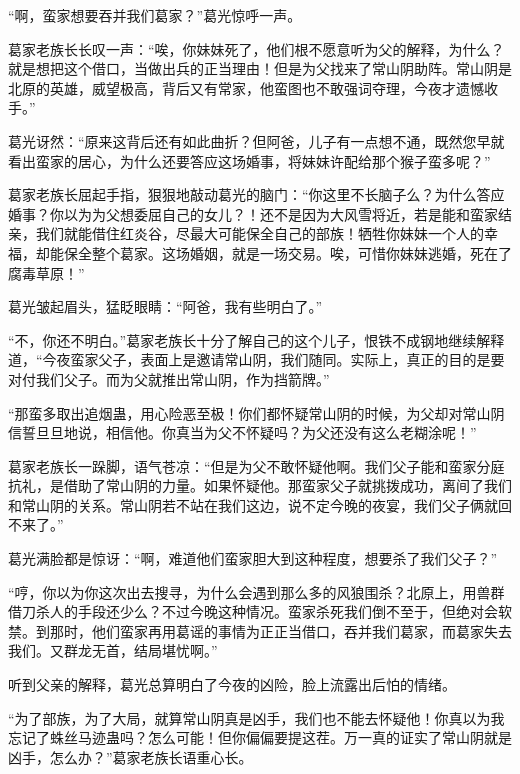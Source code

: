 
\begin{this_body}



“啊，蛮家想要吞并我们葛家？”葛光惊呼一声。

葛家老族长长叹一声：“唉，你妹妹死了，他们根不愿意听为父的解释，为什么？就是想把这个借口，当做出兵的正当理由！但是为父找来了常山阴助阵。常山阴是北原的英雄，威望极高，背后又有常家，他蛮图也不敢强词夺理，今夜才遗憾收手。”

葛光讶然：“原来这背后还有如此曲折？但阿爸，儿子有一点想不通，既然您早就看出蛮家的居心，为什么还要答应这场婚事，将妹妹许配给那个猴子蛮多呢？”

葛家老族长屈起手指，狠狠地敲动葛光的脑门：“你这里不长脑子么？为什么答应婚事？你以为为父想委屈自己的女儿？！还不是因为大风雪将近，若是能和蛮家结亲，我们就能借住红炎谷，尽最大可能保全自己的部族！牺牲你妹妹一个人的幸福，却能保全整个葛家。这场婚姻，就是一场交易。唉，可惜你妹妹逃婚，死在了腐毒草原！”

葛光皱起眉头，猛眨眼睛：“阿爸，我有些明白了。”

“不，你还不明白。”葛家老族长十分了解自己的这个儿子，恨铁不成钢地继续解释道，“今夜蛮家父子，表面上是邀请常山阴，我们随同。实际上，真正的目的是要对付我们父子。而为父就推出常山阴，作为挡箭牌。”

“那蛮多取出追烟蛊，用心险恶至极！你们都怀疑常山阴的时候，为父却对常山阴信誓旦旦地说，相信他。你真当为父不怀疑吗？为父还没有这么老糊涂呢！”

葛家老族长一跺脚，语气苍凉：“但是为父不敢怀疑他啊。我们父子能和蛮家分庭抗礼，是借助了常山阴的力量。如果怀疑他。那蛮家父子就挑拨成功，离间了我们和常山阴的关系。常山阴若不站在我们这边，说不定今晚的夜宴，我们父子俩就回不来了。”

葛光满脸都是惊讶：“啊，难道他们蛮家胆大到这种程度，想要杀了我们父子？”

“哼，你以为你这次出去搜寻，为什么会遇到那么多的风狼围杀？北原上，用兽群借刀杀人的手段还少么？不过今晚这种情况。蛮家杀死我们倒不至于，但绝对会软禁。到那时，他们蛮家再用葛谣的事情为正正当借口，吞并我们葛家，而葛家失去我们。又群龙无首，结局堪忧啊。”

听到父亲的解释，葛光总算明白了今夜的凶险，脸上流露出后怕的情绪。

“为了部族，为了大局，就算常山阴真是凶手，我们也不能去怀疑他！你真以为我忘记了蛛丝马迹蛊吗？怎么可能！但你偏偏要提这茬。万一真的证实了常山阴就是凶手，怎么办？”葛家老族长语重心长。


\end{this_body}
